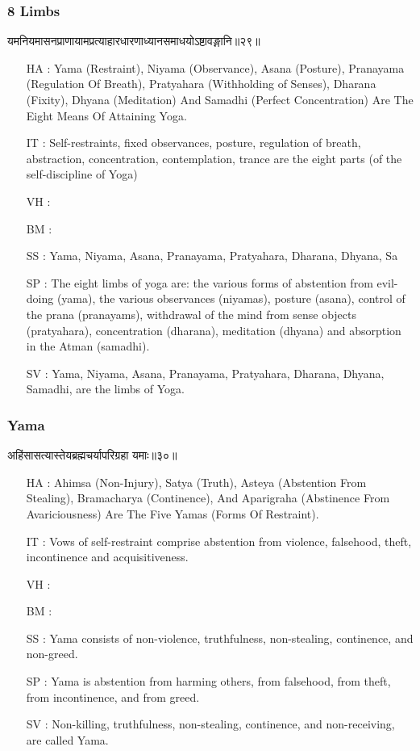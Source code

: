 \begin{frame}[fragile]\frametitle{8 Limbs}
\begin{sanskrit}
यमनियमासनप्राणायामप्रत्याहारधारणाध्यानसमाधयोऽष्टावङ्गानि॥२९॥
\end{sanskrit}

	\begin{itemize}
	\item [HA]: Yama (Restraint), Niyama (Observance), Asana (Posture), Pranayama (Regulation Of Breath), Pratyahara (Withholding of Senses), Dharana (Fixity), Dhyana (Meditation) And Samadhi (Perfect Concentration) Are The Eight Means Of Attaining Yoga.
	\item [IT]: Self-restraints, fixed observances, posture, regulation of breath, abstraction, concentration, contemplation, trance are the eight parts (of the self-discipline of Yoga)
	\item [VH]: 
	\item [BM]: 
	\item [SS]:  Yama, Niyama, Asana, Pranayama, Pratyahara, Dharana, Dhyana, Sa
	\item [SP]: The eight limbs of yoga are: the various forms of abstention from evil-doing (yama), the various observances (niyamas), posture (asana), control of the prana (pranayams), withdrawal of the mind from sense objects (pratyahara), concentration (dharana), meditation (dhyana) and absorption in the Atman (samadhi).
	\item [SV]: Yama, Niyama, Asana, Pranayama, Pratyahara, Dharana, Dhyana, Samadhi, are the limbs of Yoga. 
	\end{itemize}
\end{frame}


\begin{frame}[fragile]\frametitle{Yama}
\begin{sanskrit}
अहिंसासत्यास्तेयब्रह्मचर्यापरिग्रहा यमाः॥३०॥
\end{sanskrit}

	\begin{itemize}
	\item [HA]: Ahimsa (Non-Injury), Satya (Truth), Asteya (Abstention From Stealing), Bramacharya (Continence), And Aparigraha (Abstinence From Avariciousness) Are The Five Yamas (Forms Of Restraint).
	\item [IT]: Vows of self-restraint comprise abstention from violence, falsehood, theft, incontinence and acquisitiveness.
	\item [VH]: 
	\item [BM]: 
	\item [SS]: Yama consists of non-violence, truthfulness, non-stealing, continence, and non-greed.
	\item [SP]: Yama is abstention from harming others, from falsehood, from theft, from incontinence, and from greed.
	\item [SV]: Non-killing, truthfulness, non-stealing, continence, and non-receiving, are called Yama. 
	\end{itemize}
\end{frame}


